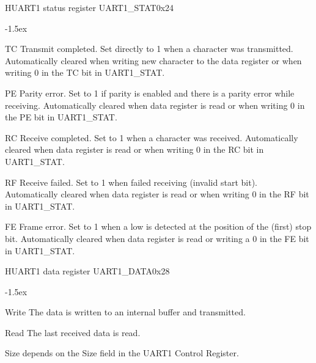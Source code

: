 \documentclass[12pt]{article}
\begin{document}
\begin{register}{H}{UART1 status register UART1\_STAT}{0x24}
\label{uart1stat}
%
%
%
%
%
%
\regnewline%
\end{register}
\begin{regdesc}[0.8\textwidth]\begin{reglist}[0000]
\itemsep-1.5ex
\item[TC] Transmit completed. Set directly to 1 when a character was transmitted. Automatically cleared when writing new character to the data register or when writing 0 in the TC bit in \mbox{UART1\_STAT}.
\item[PE] Parity error. Set to 1 if parity is enabled and there is a parity error while receiving. Automatically cleared when data register is read or when writing 0 in the PE bit in UART1\_STAT.
\item[RC] Receive completed. Set to 1 when a character was received. Automatically cleared when data register is read or when writing 0 in the RC bit in UART1\_STAT.
\item[RF] Receive failed. Set to 1 when failed receiving (invalid start bit). Automatically cleared when data register is read or when writing 0 in the RF bit in UART1\_STAT.
\item [FE] Frame error. Set to 1 when a low is detected at the position of the (first) stop bit. Automatically cleared when data register is read or writing a 0 in the FE bit in UART1\_STAT.
\end{reglist}\end{regdesc}

\begin{register}{H}{UART1 data register UART1\_DATA}{0x28}
\label{uart1data}
%
%
\regnewline%
\end{register}
\begin{regdesc}[0.6\textwidth]\begin{reglist}[000000000]
\itemsep-1.5ex
\item[Write] The data is written to an internal buffer and transmitted.
\item[Read] The last received data is read.
\end{reglist}\end{regdesc}
\hspace*{2cm}Size depends on the Size field in the UART1 Control Register.
\end{document}
